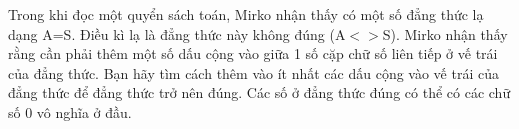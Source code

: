 Trong khi đọc một quyển sách toán, Mirko nhận thấy có một số đẳng thức lạ dạng A=S. Điều kì lạ là đẳng thức này không đúng (A$<$$>$S). Mirko nhận thấy rằng cần phải thêm một số dấu cộng vào giữa 1 số cặp chữ số liên tiếp ở vế trái của đẳng thức. Bạn hãy tìm cách thêm vào ít nhất các dấu cộng vào vế trái của đẳng thức để đẳng thức trở nên đúng. Các số ở đẳng thức đúng có thể có các chữ số 0 vô nghĩa ở đầu.